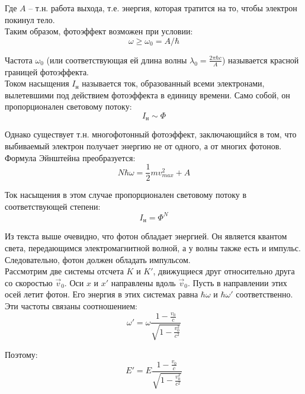 \documentclass{article}
\begin{document}
	Где $A$ -- т.н. работа выхода, т.е. энергия, которая тратится на то, чтобы электрон покинул тело.\\

	Таким образом, фотоэффект возможен при условии:
	\begin{equation}
		\omega \geq \omega_0 = A/\hbar
	\end{equation}

	Частота $\omega_0$ (или соответствующая ей длина волны $\lambda_0=\frac{2\pi\hbar c}{A}$) называется красной границей фотоэффекта.\\

	Током насыщения $I_\text{н}$ называется ток, образованный всеми электронами, вылетевшими под действием фотоэффекта в единицу времени. Само собой, он пропорционален световому потоку:
	\begin{equation}
		I_\text{н}\sim\Phi
	\end{equation}

	Однако существует т.н. многофотонный фотоэффект, заключающийся в том, что выбиваемый электрон получает энергию не от одного, а от многих фотонов. Формула Эйнштейна преобразуется:
	\begin{equation}
		N\hbar\omega = \frac{1}{2}mv_{max}^2 + A
	\end{equation}

	Ток насыщения в этом случае пропорционален световому потоку в соответствующей степени:
	\begin{equation}
		I_\text{н} = \Phi^N
	\end{equation}

	Из текста выше очевидно, что фотон обладает энергией. Он является квантом света, передающимся электромагнитной волной, а у волны также есть и импульс. Следовательно, фотон должен обладать импульсом.\\

	Рассмотрим две системы отсчета $K$ и $K'$, движущиеся друг относительно друга со скоростью $\vec v_0$. Оси $x$ и $x'$ направлены вдоль $\vec v_0$. Пусть в направлении этих осей летит фотон. Его энергия в этих системах равна $\hbar\omega$ и $\hbar\omega'$ соответственно. Эти частоты связаны соотношением:
	\begin{equation}
		\omega' = \omega\frac{1-\frac{v_0}{c}}{\sqrt{1-\frac{v_0^2}{c^2}}}
	\end{equation}

	Поэтому:
	\begin{equation}
		E'=E\frac{1-\frac{v_0}{c}}{\sqrt{1-\frac{v_0^2}{c^2}}}
	\end{equation}
\end{document}
